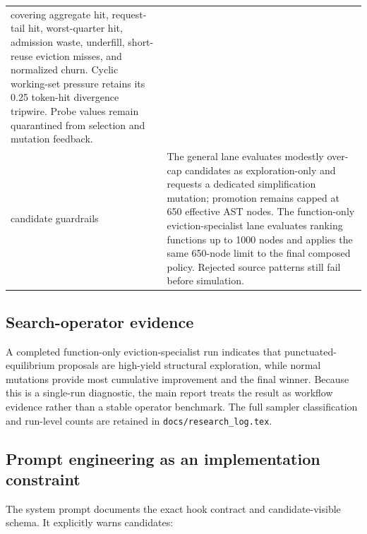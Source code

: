 \documentclass[11pt]{article}
\newcommand{\filepath}[1]{\nolinkurl{#1}}
\begin{document}
\begin{center}
\begin{tabularx}{\textwidth}{>{\ttfamily}p{} X}
covering aggregate hit, request-tail hit, worst-quarter hit, admission waste,
underfill, short-reuse eviction misses, and normalized churn.  Cyclic working-set
pressure retains its 0.25 token-hit divergence tripwire.  Probe values remain
quarantined from selection and mutation feedback. \\
candidate guardrails & The general lane evaluates modestly over-cap candidates as
exploration-only and requests a dedicated simplification mutation; promotion remains
capped at 650 effective AST nodes.  The function-only eviction-specialist lane
evaluates ranking functions up to 1000 nodes and applies the same 650-node limit to
the final composed policy.  Rejected source patterns still fail before simulation. \\
\bottomrule
\end{tabularx}
\end{center}

\subsection{Search-operator evidence}

A completed function-only eviction-specialist run indicates that punctuated-equilibrium
proposals are high-yield structural exploration, while normal mutations provide most
cumulative improvement and the final winner.  Because this is a single-run diagnostic,
the main report treats the result as workflow evidence rather than a stable operator
benchmark.  The full sampler classification and run-level counts are retained in
\filepath{docs/research_log.tex}.

\subsection{Prompt engineering as an implementation constraint}

The system prompt documents the exact hook contract and candidate-visible schema.  It
explicitly warns candidates:
\end{document}
